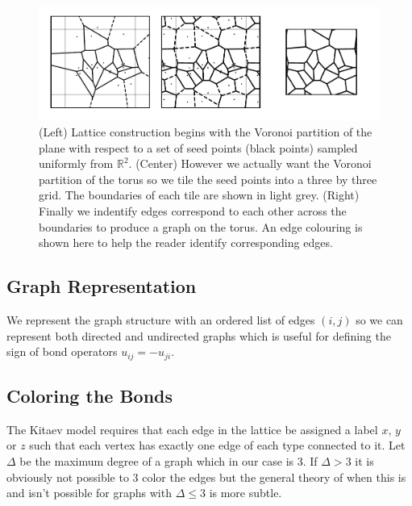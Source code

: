 \begin{figure}
\hypertarget{fig:lattice_construction_animated}{%
\centering
\includegraphics[width=1\textwidth,height=\textheight]{figure_code/amk_chapter/lattice_construction_animated/lattice_construction_animated.pdf}
\caption{(Left) Lattice construction begins with the Voronoi partition
of the plane with respect to a set of seed points (black points) sampled
uniformly from \(\mathbb{R}^2\). (Center) However we actually want the
Voronoi partition of the torus so we tile the seed points into a three
by three grid. The boundaries of each tile are shown in light grey.
(Right) Finally we indentify edges correspond to each other across the
boundaries to produce a graph on the torus. An edge colouring is shown
here to help the reader identify corresponding
edges.}\label{fig:lattice_construction_animated}
}
\end{figure}

\hypertarget{graph-representation}{%
\subsection{Graph Representation}\label{graph-representation}}

We represent the graph structure with an ordered list of edges \((i,j)\)
so we can represent both directed and undirected graphs which is useful
for defining the sign of bond operators \(u_{ij} = - u_{ji}\).

\hypertarget{coloring-the-bonds}{%
\subsection{Coloring the Bonds}\label{coloring-the-bonds}}

The Kitaev model requires that each edge in the lattice be assigned a
label \(x\), \(y\) or \(z\) such that each vertex has exactly one edge
of each type connected to it. Let \(\Delta\) be the maximum degree of a
graph which in our case is 3. If \(\Delta > 3\) it is obviously not
possible to 3 color the edges but the general theory of when this is and
isn't possible for graphs with \(\Delta \leq 3\) is more subtle.

